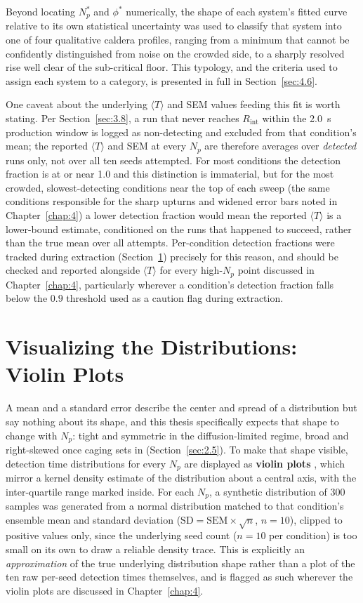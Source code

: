 Beyond locating $N_p^*$ and $\phi^*$ numerically, the shape of each system's fitted curve relative to its own statistical uncertainty was used to classify that system into one of four qualitative caldera profiles, ranging from a minimum that cannot be confidently distinguished from noise on the crowded side, to a sharply resolved rise well clear of the sub-critical floor. This typology, and the criteria used to assign each system to a category, is presented in full in Section~\ref{sec:4.6}.

One caveat about the underlying $\langle T \rangle$ and SEM values feeding this fit is worth stating. Per Section~\ref{sec:3.8}, a run that never reaches $R_\text{int}$ within the 2.0~s production window is logged as non-detecting and excluded from that condition's mean; the reported $\langle T \rangle$ and SEM at every $N_p$ are therefore averages over \emph{detected} runs only, not over all ten seeds attempted. For most conditions the detection fraction is at or near 1.0 and this distinction is immaterial, but for the most crowded, slowest-detecting conditions near the top of each sweep (the same conditions responsible for the sharp upturns and widened error bars noted in Chapter~\ref{chap:4}) a lower detection fraction would mean the reported $\langle T \rangle$ is a lower-bound estimate, conditioned on the runs that happened to succeed, rather than the true mean over all attempts. Per-condition detection fractions were tracked during extraction (Section~\ref{sec:3.11}) precisely for this reason, and should be checked and reported alongside $\langle T \rangle$ for every high-$N_p$ point discussed in Chapter~\ref{chap:4}, particularly wherever a condition's detection fraction falls below the $0.9$ threshold used as a caution flag during extraction.

\section{Visualizing the Distributions: Violin Plots}
\label{sec:3.11}
A mean and a standard error describe the center and spread of a distribution but say nothing about its shape, and this thesis specifically expects that shape to change with $N_p$: tight and symmetric in the diffusion-limited regime, broad and right-skewed once caging sets in (Section~\ref{sec:2.5}). To make that shape visible, detection time distributions for every $N_p$ are displayed as \textbf{violin plots} \cite{Hintze1998}, which mirror a kernel density estimate of the distribution about a central axis, with the inter-quartile range marked inside. For each $N_p$, a synthetic distribution of 300 samples was generated from a normal distribution matched to that condition's ensemble mean and standard deviation ($\text{SD} = \text{SEM}\times\sqrt{n}$, $n=10$), clipped to positive values only, since the underlying seed count ($n=10$ per condition) is too small on its own to draw a reliable density trace. This is explicitly an \emph{approximation} of the true underlying distribution shape rather than a plot of the ten raw per-seed detection times themselves, and is flagged as such wherever the violin plots are discussed in Chapter~\ref{chap:4}.

